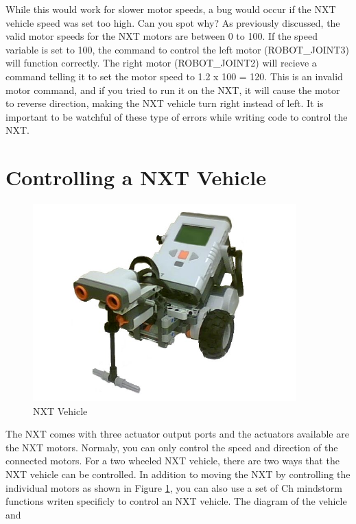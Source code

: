 \noindent
While this would work for slower motor speeds, a bug would occur if the NXT vehicle speed was 
set too high. Can you spot why? As previously discussed, the valid motor speeds for the NXT 
motors are between 0 to 100. If the speed variable is set to 100, the command to control 
the left motor (ROBOT\_JOINT3) will function correctly.  The right motor (ROBOT\_JOINT2) will recieve
a command telling it to set the motor speed to 1.2 x 100 = 120. This is an invalid motor 
command, and if you tried to run it on the NXT, it will cause the motor to reverse direction, 
making the NXT vehicle turn right instead of left. It is important to be watchful of these 
type of errors while writing code to control the NXT.\\
\newpage
\section{Controlling a NXT Vehicle}
\begin{figure}[h!]
  \begin{center}
    \includegraphics[height=3in]{figure/mindstorm/NXT_vehicle.png}
    \caption{NXT Vehicle\label{fig_NXT_vehicle}}
  \end{center}
\end{figure}
\noindent
The NXT comes with three actuator output ports and the actuators available are the NXT motors. 
Normaly, you can only control the speed and direction of the connected motors. For a two wheeled NXT 
vehicle, there are two ways that the NXT vehicle can be controlled.  In addition to moving the NXT by
controlling the individual motors as shown in Figure \ref{fig_NXT_vehicle}, you can also use a set of
Ch mindstorm functions writen specificly to control an NXT vehicle. The diagram of the vehicle and 
